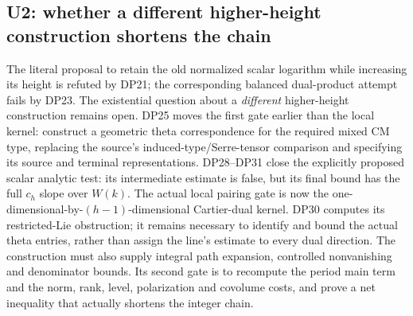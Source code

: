 \documentclass[11pt,a4paper]{article}
\theoremstyle{definition}\newtheorem{remark}[theorem]{Remark}
\begin{document}
\subsection{U2: whether a different higher-height construction shortens the chain}

The literal proposal to retain the old normalized scalar logarithm while increasing its height is refuted by DP21; the corresponding balanced dual-product attempt fails by DP23. The existential question about a \emph{different} higher-height construction remains open. DP25 moves the first gate earlier than the local kernel: construct a geometric theta correspondence for the required mixed CM type, replacing the source's induced-type/Serre-tensor comparison and specifying its source and terminal representations. DP28--DP31 close the explicitly proposed scalar analytic test: its intermediate estimate is false, but its final bound has the full $c_h$ slope over $W(k)$. The actual local pairing gate is now the one-dimensional-by-$(h-1)$-dimensional Cartier-dual kernel. DP30 computes its restricted-Lie obstruction; it remains necessary to identify and bound the actual theta entries, rather than assign the line's estimate to every dual direction. The construction must also supply integral path expansion, controlled nonvanishing and denominator bounds. Its second gate is to recompute the period main term and the norm, rank, level, polarization and covolume costs, and prove a net inequality that actually shortens the integer chain.
\end{document}
